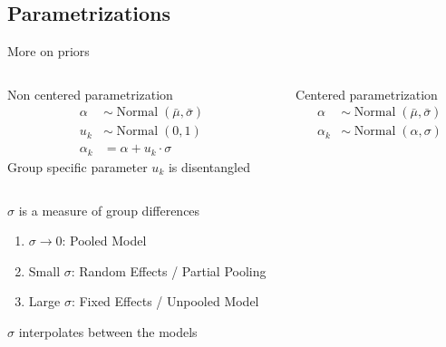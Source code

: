 \documentclass{beamer}
\begin{document}
\subsection{Parametrizations}
\begin{frame}{More on priors}
\begin{columns}[t]
\begin{column}{0.5\linewidth}
Non centered parametrization
\begin{align*}
    \alpha &\sim \operatorname{Normal}(\bar\mu, \bar\sigma)\\
    u_k &\sim \operatorname{Normal}(0, 1)\\
    \alpha_k & = \alpha + u_k \cdot \sigma
\end{align*}
Group specific parameter $u_k$ is disentangled
\end{column}
\begin{column}{0.5\linewidth}
Centered parametrization
\begin{align*}
    \alpha &\sim \operatorname{Normal}(\bar\mu, \bar\sigma)\\
    \alpha_k &\sim \operatorname{Normal}(\alpha, \sigma)
\end{align*}
\end{column}
\end{columns}
\vspace{1em}
$\sigma$ is a measure of group differences
\begin{enumerate}
    \item $\sigma \to 0$: Pooled Model
    \item Small $\sigma$: Random Effects / Partial Pooling
    \item Large $\sigma$: Fixed Effects / Unpooled Model
\end{enumerate}
$\sigma$ interpolates between the models
\end{frame}
\end{document}
